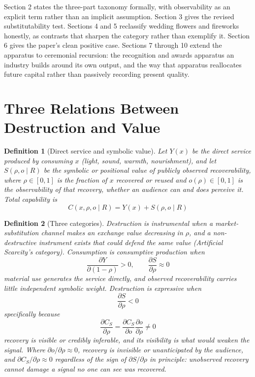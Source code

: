 \documentclass[11pt]{article}
\newtheorem{definition}{Definition}[section]
\begin{document}
Section 2 states the three-part taxonomy formally, with observability as an explicit term rather than an implicit assumption. Section 3 gives the revised substitutability test. Sections 4 and 5 reclassify wedding flowers and fireworks honestly, as contrasts that sharpen the category rather than exemplify it. Section 6 gives the paper's clean positive case. Sections 7 through 10 extend the apparatus to ceremonial recursion: the recognition and awards apparatus an industry builds around its own output, and the way that apparatus reallocates future capital rather than passively recording present quality.

\section{Three Relations Between Destruction and Value}

\begin{definition}[Direct service and symbolic value]
Let $Y(x)$ be the direct service produced by consuming $x$ (light, sound, warmth, nourishment), and let $S(\rho, o \mid R)$ be the symbolic or positional value of publicly observed recoverability, where $\rho \in [0,1]$ is the fraction of $x$ recovered or reused and $o(\rho) \in [0,1]$ is the observability of that recovery, whether an audience can and does perceive it. Total capability is
\[
C(x, \rho, o \mid R) = Y(x) + S(\rho, o \mid R)
\]
\end{definition}

\begin{definition}[Three categories]
Destruction is \emph{instrumental} when a market-substitution channel makes an exchange value decreasing in $\rho$, and a non-destructive instrument exists that could defend the same value (\emph{Artificial Scarcity}'s category). Consumption is \emph{consumptive production} when
\[
\frac{\partial Y}{\partial (1-\rho)} > 0, \qquad \frac{\partial S}{\partial \rho} \approx 0
\]
material use generates the service directly, and observed recoverability carries little independent symbolic weight. Destruction is \emph{expressive} when
\[
\frac{\partial S}{\partial \rho} < 0
\]
specifically because
\[
\frac{\partial C_S}{\partial \rho} = \frac{\partial C_S}{\partial o}\frac{\partial o}{\partial \rho} \neq 0
\]
recovery is visible or credibly inferable, and its visibility is what would weaken the signal. Where $\partial o/\partial \rho \approx 0$, recovery is invisible or unanticipated by the audience, and $\partial C_S/\partial \rho \approx 0$ regardless of the sign of $\partial S/\partial \rho$ in principle: unobserved recovery cannot damage a signal no one can see was recovered.
\end{definition}
\end{document}

